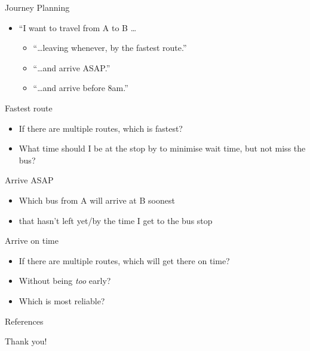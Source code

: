 \documentclass[10pt,t]{beamer}
\begin{document}
\begin{frame}{Journey Planning}
  \begin{itemize}[<+->]
  \item \alert<5->{``I want to travel from A to B \ldots}
    \begin{itemize}
    \item \alert<5>{``\ldots leaving whenever, by the fastest route.''}
    \item \alert<6>{``\ldots and arrive ASAP.''}
    \item \alert<7>{``\ldots and arrive before 8am.''}
    \end{itemize}
  \end{itemize}
  
  \vspace{1em}
  \begin{overprint}
    \begin{block}{Fastest route}
      \begin{itemize}
      \item If there are multiple routes, which is fastest?
      \item What time should I be at the stop by to minimise wait time, but not miss the
        bus?
      \end{itemize}
    \end{block}
    \begin{block}{Arrive ASAP}
      \begin{itemize}
      \item Which bus from A will arrive at B soonest
      \item that hasn't left yet/by the time I get to the bus stop
      \end{itemize}
    \end{block}
    \begin{block}{Arrive on time}
      \begin{itemize}
      \item If there are multiple routes, which will get there on time?
      \item Without being \emph{too} early?
      \item Which is most reliable?
      \end{itemize}
    \end{block}
  \end{overprint}
\end{frame}


\begin{frame}{References}
  \scriptsize
  \begingroup
  \renewcommand{\section}[2]{}%
  
  \endgroup
\end{frame}



\begin{frame}[standout]
  Thank you!
\end{frame}
\end{document}
